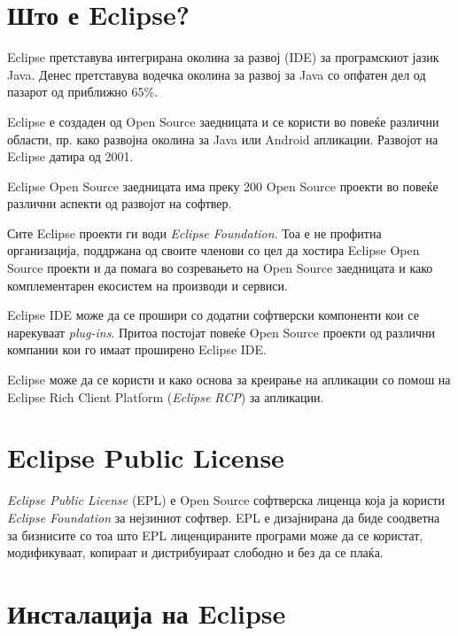 

\chead{}
\lfoot{}
\cfoot{\thepage}
\rfoot{}
\usepackage{fancyvrb}
\usepackage{xcolor}

\usepackage{textcomp}




\section{Што е Eclipse?}
Eclipse претставува интегрирана околина за развој (IDE) за програмскиот јазик
Java. Денес претставува водечка околина за развој за Java со опфатен дел од
пазарот од приближно 65\%.

Eclipse е создаден од Open Source заедницата и се користи во повеќе различни
области, пр. како развојна околина за Java или Android апликации.
Развојот на Eclipse датира од 2001.

Eclipse Open Source заедницата има преку 200 Open Source проекти во
повеќе различни аспекти од развојот на софтвер.

Сите Eclipse проекти ги води \emph{Eclipse Foundation}. Тоа е не профитна
организација, поддржана од своите членови со цел да хостира Eclipse Open Source
проекти и да помага во созревањето на Open Source заедницата и како
комплементарен екосистем на производи и сервиси.

Eclipse IDE може да се прошири со додатни софтверски компоненти кои се
нарекуваат \emph{plug-ins}. Притоа постојат повеќе Open Source проекти од
различни компании кои го имаат проширено Eclipse IDE.

Eclipse може да се користи и како основа за креирање на апликации со помош на
Eclipse Rich Client Platform (\emph{Eclipse RCP}) за апликации.

\section{Eclipse Public License}

\emph{Eclipse Public License} (EPL) е Open Source софтверска лиценца која ја
користи \emph{Eclipse Foundation} за нејзиниот софтвер. EPL е дизајнирана да
биде соодветна за бизнисите со тоа што EPL лиценцираните програми може да се
користат, модификуваат, копираат и дистрибуираат слободно и без да се плаќа.


\section{Инсталација на Eclipse}

